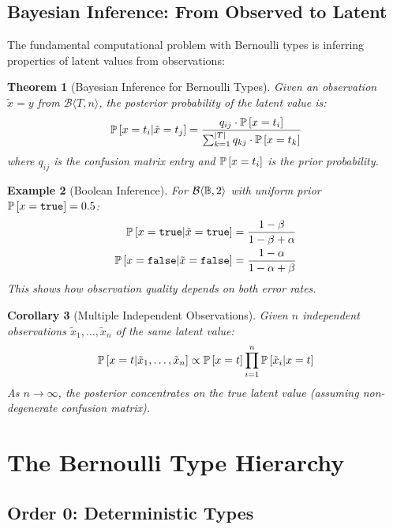 \documentclass[11pt,final,hidelinks]{article}
\newtheorem{theorem}{Theorem}[section]
\newtheorem{corollary}[theorem]{Corollary}
\newtheorem{example}[theorem]{Example}
\newcommand{\bernoulli}[2]{\mathcal{B}\langle #1, #2 \rangle}
\begin{document}
\subsection{Bayesian Inference: From Observed to Latent}

The fundamental computational problem with Bernoulli types is inferring properties of latent values from observations:

\begin{theorem}[Bayesian Inference for Bernoulli Types]
Given an observation $\tilde{x} = y$ from $\bernoulli{T}{n}$, the posterior probability of the latent value is:
\begin{equation}
\mathbb{P}\left[x = t_i | \tilde{x} = t_j\right] = \frac{q_{ij} \cdot \mathbb{P}\left[x = t_i\right]}{\sum_{k=1}^{|T|} q_{kj} \cdot \mathbb{P}\left[x = t_k\right]}
\end{equation}
where $q_{ij}$ is the confusion matrix entry and $\mathbb{P}\left[x = t_i\right]$ is the prior probability.
\end{theorem}

\begin{example}[Boolean Inference]
For $\bernoulli{\Bool}{2}$ with uniform prior $\mathbb{P}\left[x = \mathtt{true}\right] = 0.5$:
\begin{align}
\mathbb{P}\left[x = \mathtt{true} | \tilde{x} = \mathtt{true}\right] &= \frac{1-\beta}{1-\beta + \alpha} \\
\mathbb{P}\left[x = \mathtt{false} | \tilde{x} = \mathtt{false}\right] &= \frac{1-\alpha}{1-\alpha + \beta}
\end{align}
This shows how observation quality depends on both error rates.
\end{example}

\begin{corollary}[Multiple Independent Observations]
Given $n$ independent observations $\tilde{x}_1, \ldots, \tilde{x}_n$ of the same latent value:
\begin{equation}
\mathbb{P}\left[x = t | \tilde{x}_1, \ldots, \tilde{x}_n\right] \propto \mathbb{P}\left[x = t\right] \prod_{i=1}^n \mathbb{P}\left[\tilde{x}_i | x = t\right]
\end{equation}
As $n \to \infty$, the posterior concentrates on the true latent value (assuming non-degenerate confusion matrix).
\end{corollary}

\section{The Bernoulli Type Hierarchy}

\subsection{Order 0: Deterministic Types}
\end{document}
